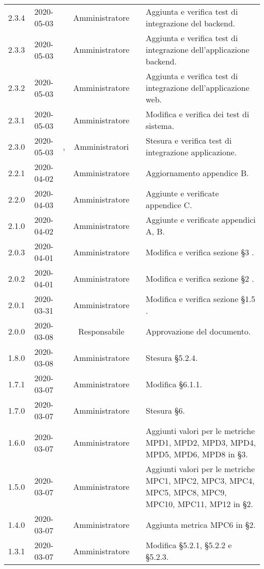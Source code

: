 {\begin{longtable}{ c c  C{2.3cm} c C{3cm} C{3.2cm}}
2.3.4 & 2020-05-03 & \CE{} & Amministratore & \AT{} & Aggiunta e verifica test di integrazione del backend. \\
2.3.3 & 2020-05-03 & \PF{} & Amministratore & \AT{} & Aggiunta e verifica test di integrazione dell'applicazione backend. \\
2.3.2 & 2020-05-03 & \PF{} & Amministratore & \AT{} & Aggiunta e verifica test di integrazione dell'applicazione web. \\
2.3.1 & 2020-05-03 & \MC{} & Amministratore & \AT{} & Modifica e verifica dei test di sistema. \\
2.3.0 & 2020-05-03 & \MC{}, \DF{} & Amministratori & \AT{} & Stesura e verifica test di integrazione applicazione. \\
2.2.1 & 2020-04-02 & \PF{} & Amministratore & \AT{} & Aggiornamento appendice B.\\
2.2.0 & 2020-04-03 & \PF{} & Amministratore & \AT{} & Aggiunte e verificate appendice C.\\
2.1.0 & 2020-04-02 & \PF{} & Amministratore & \AT{} & Aggiunte e verificate appendici A, B.\\
2.0.3 & 2020-04-01 & \PF{} & Amministratore & \AT{} & Modifica e verifica sezione §3 .\\
2.0.2 & 2020-04-01 & \PF{} & Amministratore & \AT{} & Modifica e verifica sezione §2 .\\
2.0.1 & 2020-03-31 & \PF{} & Amministratore & \AT{} & Modifica e verifica sezione §1.5 .\\
2.0.0 & 2020-03-08 & \BR{} & Responsabile & \DF{}& Approvazione del documento. \\
1.8.0 & 2020-03-08 & \PF{} & Amministratore & \AT{} & Stesura §5.2.4. \\
1.7.1 & 2020-03-07 & \DF{} & Amministratore & \SE{} & Modifica §6.1.1. \\
1.7.0 & 2020-03-07 & \CE{} & Amministratore & \SE{} & Stesura §6. \\
1.6.0 & 2020-03-07 & \CE{} & Amministratore & \AT{} & Aggiunti valori per le metriche MPD1, MPD2, MPD3, MPD4, MPD5, MPD6, MPD8 in §3. \\
1.5.0 & 2020-03-07 & \PF{} & Amministratore & \AT{} & Aggiunti valori per le metriche MPC1, MPC2, MPC3, MPC4, MPC5, MPC8, MPC9, MPC10, MPC11, MP12 in §2. \\
1.4.0 & 2020-03-07 & \DF{} & Amministratore & \AT{} & Aggiunta metrica MPC6 in §2. \\
1.3.1 & 2020-03-07 & \CE{} & Amministratore & \SE{} & Modifica §5.2.1, §5.2.2 e §5.2.3. \\

\end{longtable}}
